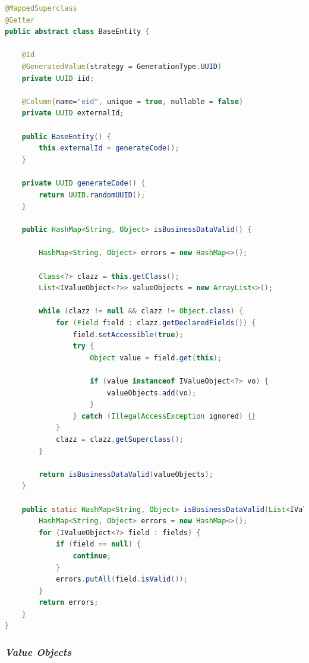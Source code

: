 \begin{lstlisting}[language=Java,caption={Classe \textit{BaseEntity}},label={lst:backend-base-entity}]
@MappedSuperclass
@Getter
public abstract class BaseEntity {

    @Id
    @GeneratedValue(strategy = GenerationType.UUID)
    private UUID iid;

    @Column(name="eid", unique = true, nullable = false)
    private UUID externalId;

    public BaseEntity() {
        this.externalId = generateCode();
    }

    private UUID generateCode() {
        return UUID.randomUUID();
    }

    public HashMap<String, Object> isBusinessDataValid() {

        HashMap<String, Object> errors = new HashMap<>();

        Class<?> clazz = this.getClass();
        List<IValueObject<?>> valueObjects = new ArrayList<>();

        while (clazz != null && clazz != Object.class) {
            for (Field field : clazz.getDeclaredFields()) {
                field.setAccessible(true);
                try {
                    Object value = field.get(this);

                    if (value instanceof IValueObject<?> vo) {
                        valueObjects.add(vo);
                    }
                } catch (IllegalAccessException ignored) {}
            }
            clazz = clazz.getSuperclass();
        }

        return isBusinessDataValid(valueObjects);
    }

    public static HashMap<String, Object> isBusinessDataValid(List<IValueObject<?>> fields) {
        HashMap<String, Object> errors = new HashMap<>();
        for (IValueObject<?> field : fields) {
            if (field == null) {
                continue;
            }
            errors.putAll(field.isValid());
        }
        return errors;
    }
}

\end{lstlisting}












\subsubsection{\textit{Value Objects}}
\label{sec:backend-value-objects}

